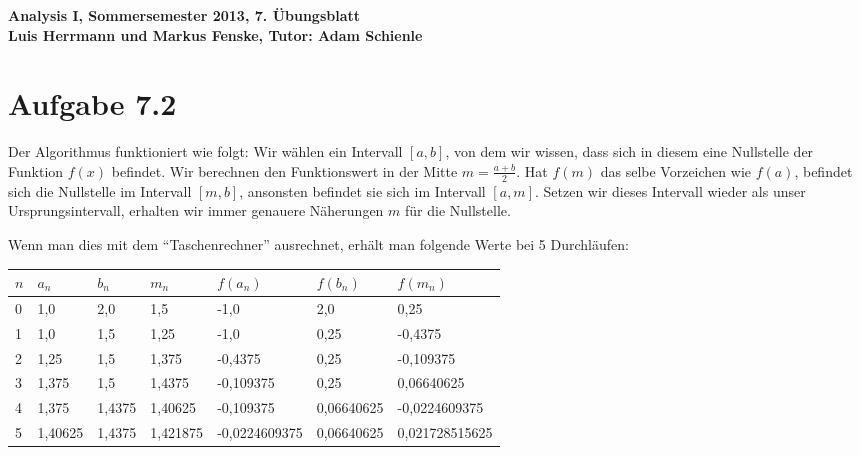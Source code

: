 \documentclass[a4paper,german,12pt,smallheadings]{scrartcl}
\begin{document}
\begin{center}
\bfseries %
\sffamily %
\vspace{-40pt}
Analysis I, Sommersemester 2013, 7. Übungsblatt \\
Luis Herrmann und Markus Fenske, Tutor: Adam Schienle
\vspace{-10pt}
\end{center}

\section*{Aufgabe 7.2}

Der Algorithmus funktioniert wie folgt: Wir wählen ein Intervall $[a,b]$, von
dem wir wissen, dass sich in diesem eine Nullstelle der Funktion $f(x)$
befindet. Wir berechnen den Funktionswert in der Mitte $m = \frac{a+b}{2}$. Hat
$f(m)$ das selbe Vorzeichen wie $f(a)$, befindet sich die Nullstelle im
Intervall $[m, b]$, ansonsten befindet sie sich im Intervall $[a, m]$. Setzen
wir dieses Intervall wieder als unser Ursprungsintervall, erhalten wir immer
genauere Näherungen $m$ für die Nullstelle.

Wenn man dies mit dem ``Taschenrechner'' ausrechnet,
erhält man folgende Werte bei 5 Durchläufen:

\vspace{20pt}
\begin{tabular}{lllllll}
\hline
$n$ & $a_n$   & $b_n$ & $m_n$ & $f(a_n)$ & $f(b_n)$ & $f(m_n)$ \\ \hline
0 & 1{,}0 & 2{,}0 & 1{,}5 & -1{,}0 & 2{,}0 & 0{,}25 \\
1 & 1{,}0 & 1{,}5 & 1{,}25 & -1{,}0 & 0{,}25 & -0{,}4375 \\
2 & 1{,}25 & 1{,}5 & 1{,}375 & -0{,}4375 & 0{,}25 & -0{,}109375 \\
3 & 1{,}375 & 1{,}5 & 1{,}4375 & -0{,}109375 & 0{,}25 & 0{,}06640625 \\
4 & 1{,}375 & 1{,}4375 & 1{,}40625 & -0{,}109375 & 0{,}06640625 & -0{,}0224609375 \\
5 & 1{,}40625 & 1{,}4375 & 1{,}421875 & -0{,}0224609375 & 0{,}06640625 & 0{,}021728515625 \\
\hline
\end{tabular}
\vspace{20pt}
\end{document}
